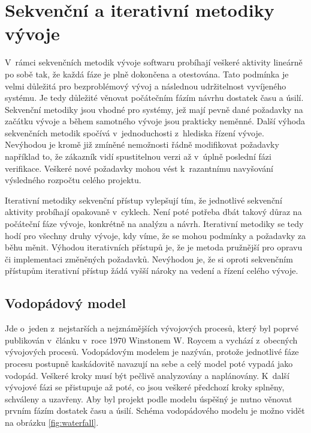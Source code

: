 \documentclass[czech,master]{diploma}
\begin{document}
\section{Sekvenční a iterativní metodiky vývoje}
V~rámci sekvenčních metodik vývoje softwaru probíhají veškeré aktivity lineárně po sobě tak, že každá fáze je plně dokončena a otestována. Tato podmínka je velmi důležitá pro bezproblémový vývoj a následnou udržitelnost vyvíjeného systému. Je tedy důležité věnovat počátečním fázím návrhu dostatek času a úsilí. Sekvenční metodiky jsou vhodné pro systémy, jež mají pevně dané požadavky na začátku vývoje a během samotného vývoje jsou prakticky neměnné. Další výhoda sekvenčních metodik spočívá v~jednoduchosti z~hlediska řízení vývoje. Nevýhodou je kromě již zmíněné nemožnosti řádně modifikovat požadavky například to, že zákazník vidí spustitelnou verzi až v~úplně poslední fázi verifikace. Veškeré nové požadavky mohou vést k~razantnímu navyšování výsledného rozpočtu celého projektu.

Iterativní metodiky sekvenční přístup vylepšují tím, že jednotlivé sekvenční aktivity probíhají opakovaně v~cyklech. Není poté potřeba dbát takový důraz na počáteční fáze vývoje, konkrétně na analýzu a návrh. Iterativní metodiky se tedy hodí pro všechny druhy vývoje, kdy víme, že se mohou podmínky a požadavky za běhu měnit. Výhodou iterativních přístupů je, že je metoda pružnější pro opravu či implementaci změněných požadavků. Nevýhodou je, že si oproti sekvenčním přístupům iterativní přístup žádá vyšší nároky na vedení a řízení celého vývoje.

\subsection{Vodopádový model}
Jde o~jeden z~nejstarších a nejznámějších vývojových procesů, který byl poprvé publikován v~článku v~roce 1970 Winstonem W. Roycem a vychází z~obecných vývojových procesů. Vodopádovým modelem je nazýván, protože jednotlivé fáze procesu postupně kaskádovitě navazují na sebe a celý model poté vypadá jako vodopád. Veškeré kroky musí být pečlivě analyzovány a naplánovány. K~další vývojové fázi se přistupuje až poté, co jsou veškeré předchozí kroky splněny, schváleny a uzavřeny. \cite{ref:sommerrville_waterfall} Aby byl projekt podle modelu úspěšný je nutno věnovat prvním fázím dostatek času a úsilí. Schéma vodopádového modelu je možno vidět na obrázku \ref{fig:waterfall}.
\end{document}
